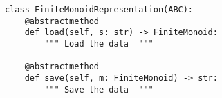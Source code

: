 \par\begin{minipage}{60ex}
\begin{verbatim}
class FiniteMonoidRepresentation(ABC):
    @abstractmethod
    def load(self, s: str) -> FiniteMonoid:
        """ Load the data  """

    @abstractmethod
    def save(self, m: FiniteMonoid) -> str:
        """ Save the data  """
\end{verbatim}
\end{minipage}\par